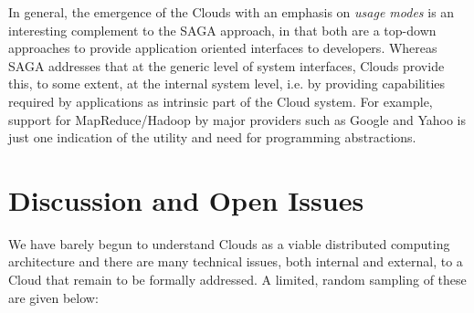 \documentclass[conference,final]{IEEEtran}
\newcommand{\I}[1]{\textit{#1}}
\begin{document}
  In general, the emergence of the Clouds with an emphasis on \I{usage
  modes} is an interesting complement to the SAGA approach, in that
  both are a top-down approaches to provide application oriented
  interfaces to developers.  Whereas SAGA addresses that at the
  generic level of system interfaces, Clouds provide this, to some
  extent, at the internal system level, i.e. by providing capabilities
  required by applications as intrinsic part of the Cloud system. For
  example, support for MapReduce/Hadoop by major providers such as
  Google and Yahoo is just one indication of the utility and need for
  programming abstractions.


\section{Discussion and Open Issues}
 
 We have barely begun to understand Clouds as a viable distributed
 computing architecture and there are many technical issues, both
 internal and external, to a Cloud that remain to be formally
 addressed.  A limited, random sampling of these are given below:
\end{document}
